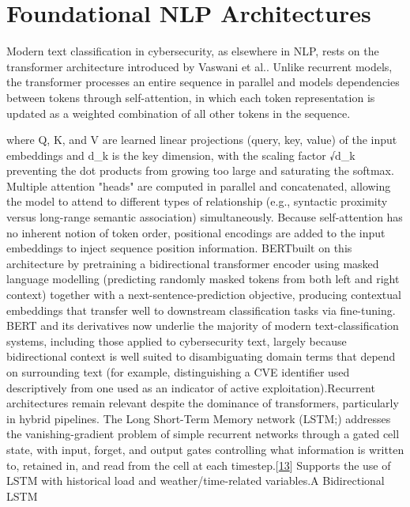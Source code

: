 \documentclass[12pt,a4paper]{report}
\begin{document}
\section{Foundational NLP
Architectures}\label{foundational-nlp-architectures}

Modern text classification in cybersecurity, as elsewhere in NLP, rests
on the transformer architecture introduced by Vaswani et
al.\cite{vaswani2017attention}. Unlike recurrent models, the
transformer processes an entire sequence in parallel and models
dependencies between tokens through self-attention, in which each token
representation is updated as a weighted combination of all other tokens
in the sequence.

where Q, K, and V are learned linear projections (query, key, value) of
the input embeddings and d\_k is the key dimension, with the scaling
factor √d\_k preventing the dot products from growing too large and
saturating the softmax. Multiple attention "heads" are computed in
parallel and concatenated, allowing the model to attend to different
types of relationship (e.g., syntactic proximity versus long-range
semantic association) simultaneously. Because self-attention has no
inherent notion of token order, positional encodings are added to the
input embeddings to inject sequence position information.
BERT\cite{bert2018}built on this architecture by
pretraining a bidirectional transformer encoder using masked language
modelling (predicting randomly masked tokens from both left and right
context) together with a next-sentence-prediction objective, producing
contextual embeddings that transfer well to downstream classification
tasks via fine-tuning. BERT and its derivatives now underlie the
majority of modern text-classification systems, including those applied
to cybersecurity text, largely because bidirectional context is well
suited to disambiguating domain terms that depend on surrounding text
(for example, distinguishing a CVE identifier used descriptively from
one used as an indicator of active exploitation).Recurrent architectures
remain relevant despite the dominance of transformers, particularly in
hybrid pipelines. The Long Short-Term Memory network
(LSTM;\cite{lstm1997}) addresses the vanishing-gradient
problem of simple recurrent networks through a gated cell state, with
input, forget, and output gates controlling what information is written
to, retained in, and read from the cell at each
timestep.{[}\hyperref[ref_13]{13}{]} Supports the use of LSTM with
historical load and weather/time-related variables.A Bidirectional LSTM
\end{document}
